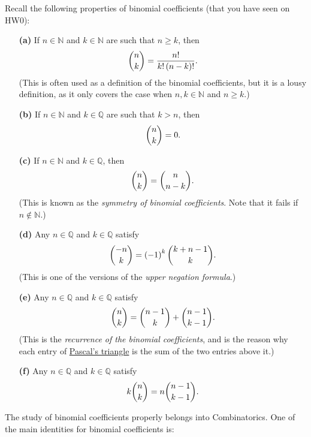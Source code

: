 \documentclass[numbers=enddot,12pt,final,onecolumn,notitlepage]{scrartcl}%
\numberwithin{exer}{subsection}
\theoremstyle{definition}
\begin{document}
Recall the following properties of binomial coefficients (that you have seen
on HW0):

\begin{enumerate}
\item[\textbf{(a)}] If $n \in\mathbb{N}$ and $k \in\mathbb{N}$ are such that
$n \geq k$, then
\[
\dbinom{n}{k} = \dfrac{n!}{k! \left(  n-k \right)  !} .
\]
(This is often used as a definition of the binomial coefficients, but it is a
lousy definition, as it only covers the case when $n, k \in\mathbb{N}$ and $n
\geq k$.)

\item[\textbf{(b)}] If $n \in\mathbb{N}$ and $k \in\mathbb{Q}$ are such that
$k > n$, then
\[
\dbinom{n}{k} = 0.
\]


\item[\textbf{(c)}] If $n \in\mathbb{N}$ and $k \in\mathbb{Q}$, then
\begin{align}
\dbinom{n}{k} = \dbinom{n}{n-k} . \label{eq.exe.binom.101.c}%
\end{align}
(This is known as the \textit{symmetry of binomial coefficients}. Note that it
fails if $n \notin\mathbb{N}$.)

\item[\textbf{(d)}] Any $n \in\mathbb{Q}$ and $k \in\mathbb{Q}$ satisfy
\begin{align}
\dbinom{-n}{k} = \left(  -1 \right)  ^{k} \dbinom{k + n - 1}{k} .
\label{eq.exe.binom.101.d}%
\end{align}
(This is one of the versions of the \textit{upper negation formula}.)

\item[\textbf{(e)}] Any $n \in\mathbb{Q}$ and $k \in\mathbb{Q}$ satisfy
\begin{align}
\dbinom{n}{k} = \dbinom{n-1}{k} + \dbinom{n-1}{k-1} .
\label{eq.exe.binom.101.e}%
\end{align}
(This is the \textit{recurrence of the binomial coefficients}, and is the
reason why each entry of
\href{https://en.wikipedia.org/wiki/Pascal%27s_triangle}{Pascal's triangle} is
the sum of the two entries above it.)

\item[\textbf{(f)}] Any $n\in\mathbb{Q}$ and $k\in\mathbb{Q}$ satisfy
\[
k\dbinom{n}{k}=n\dbinom{n-1}{k-1}.
\]

\end{enumerate}

The study of binomial coefficients properly belongs into Combinatorics. One of
the main identities for binomial coefficients is:
\end{document}
